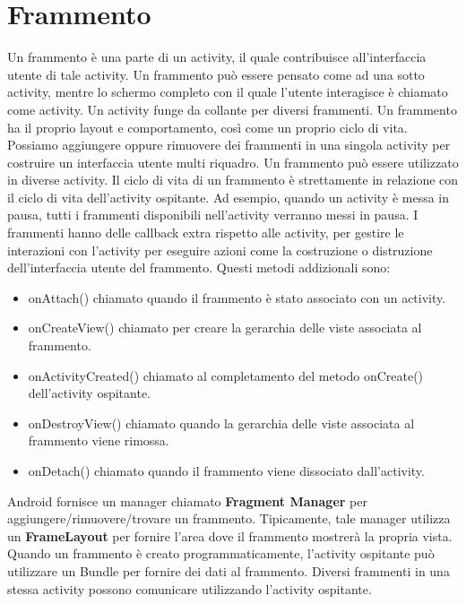 \section{Frammento}
Un frammento è una parte di un activity, il quale contribuisce all'interfaccia utente di tale activity. Un frammento può essere pensato come ad una sotto activity, mentre lo schermo completo con il quale l'utente interagisce è chiamato come activity. Un activity funge da collante per diversi frammenti. Un frammento ha il proprio layout e comportamento, così come un proprio ciclo di vita. Possiamo aggiungere oppure rimuovere dei frammenti in una singola activity per costruire un interfaccia utente multi riquadro. Un frammento può essere utilizzato in diverse activity. Il ciclo di vita di un frammento è strettamente in relazione con il ciclo di vita dell'activity ospitante. Ad esempio, quando un activity è messa in pausa, tutti i frammenti disponibili nell'activity verranno messi in pausa. I frammenti hanno delle callback extra rispetto alle activity, per gestire le interazioni con l'activity per eseguire azioni come la costruzione o distruzione dell'interfaccia utente del frammento. Questi metodi addizionali sono:
\begin{itemize}
\item onAttach() chiamato quando il frammento è stato associato con un activity.
\item onCreateView() chiamato per creare la gerarchia delle viste associata al frammento.
\item onActivityCreated() chiamato al completamento del metodo onCreate() dell'activity ospitante.
\item onDestroyView() chiamato quando la gerarchia delle viste associata al frammento viene rimossa.
\item onDetach() chiamato quando il frammento viene dissociato dall'activity.
\end{itemize} 
Android fornisce un manager chiamato \textbf{Fragment Manager} per aggiungere/rimuovere/trovare un frammento. Tipicamente, tale manager utilizza un \textbf{FrameLayout} per fornire l'area dove il frammento mostrerà la propria vista. Quando un frammento è creato programmaticamente, l'activity ospitante può utilizzare un Bundle per fornire dei dati al frammento. Diversi frammenti in una stessa activity possono comunicare utilizzando l'activity ospitante.
